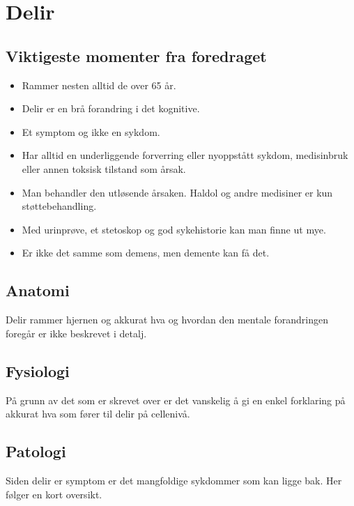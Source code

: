 \chapter{Delir}\label{delir}%
		\section{Viktigeste momenter fra foredraget}
			\begin{itemize}
				\item Rammer nesten alltid de over 65 år.\\
				\item Delir er en brå forandring i det kognitive.\\
				\item Et symptom og ikke en sykdom.\\
				\item Har alltid en underliggende forverring eller nyoppstått sykdom, medisinbruk eller annen toksisk tilstand som årsak.\\
				\item Man behandler den utløsende årsaken. Haldol og andre medisiner er kun støttebehandling.\\
				\item Med urinprøve, et stetoskop og god sykehistorie kan man finne ut mye.\\
				\item Er ikke det samme som demens, men demente kan få det.\\
			\end{itemize}
		\section{Anatomi}
			Delir rammer hjernen og akkurat hva og hvordan den mentale forandringen foregår er ikke beskrevet i detalj\cite{rev_compre}\cite{pers_delir}.
		\section{Fysiologi}
			På grunn av det som er skrevet over er det vanskelig å gi en enkel forklaring på akkurat hva som fører til delir på cellenivå.
		\section{Patologi}
			Siden delir er symptom er det mangfoldige sykdommer som kan ligge bak. Her følger en kort oversikt\cite{legevakthandboka}.
